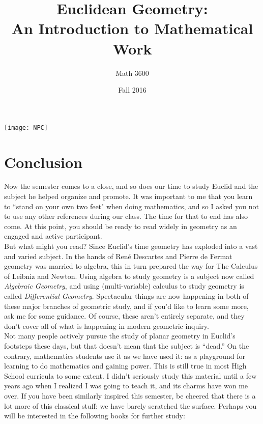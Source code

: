 \documentclass{tufte-handout}
\title{Euclidean Geometry:\\An Introduction to Mathematical Work}
\author[Math 3600]{Math 3600}
\date{Fall 2016}
\theoremstyle{definition}
\begin{document}
\maketitle

\begin{marginfigure}
    \texttt{[image: NPC]}
\end{marginfigure}

\section*{Conclusion}


Now the semester comes to a close, and so does our time to study Euclid and the subject he helped organize and promote. It was important to me that you learn to ``stand on your own two feet" when doing mathematics, and so I asked you not to use any other references during our class. The time for that to end has also come. At this point, you should be ready to read widely in geometry as an engaged and active participant.\\

But what might you read? Since Euclid's time geometry has exploded into a vast and varied subject. 
In the hands of Ren\'{e} Descartes and Pierre de Fermat geometry was married to algebra, this in turn prepared the way for The Calculus of Leibniz and Newton. 
Using algebra to study geometry is a subject now called \emph{Algebraic Geometry}, and using (multi-variable) calculus to study geometry is called \emph{Differential Geometry}.  Spectacular things are now happening in both of these major branches of geometric study, and if you'd like to learn some more, ask me for some guidance. 
Of course, these aren't entirely separate, and they don't cover all of what is happening in modern geometric inquiry.\\

Not many people actively pursue the study of planar geometry in Euclid's footsteps these days, but that doesn't mean that the subject is ``dead.'' On the contrary, mathematics students use it as we have used it: as a playground for learning to do mathematics and gaining power. This is still true in most High School curricula to some extent. I didn't seriously study this material until a few years ago when I realized I was going to teach it, and its charms have won me over. If you have been similarly inspired this semester, be cheered that there is a lot more of this classical stuff: we have barely scratched the surface. Perhaps you will be interested in the following books for further study:
\end{document}
